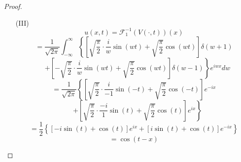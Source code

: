 \documentclass[linespread=1.5,openany]{book}%
\theoremstyle{plain}
\begin{document}
{{{\begin{proof}
\begin{itemize}
							最后得
							\begin{equation}
								\begin{aligned}
									V(w, t) &= \sqrt{\frac{\pi}{2}} \cdot \frac{i}{w} \left[ \delta(w + 1) - \delta(w - 1) \right] \sin(wt) \\[8pt]
									&\quad + \sqrt{\frac{\pi}{2}} \left[ \delta(w + 1) + \delta(w - 1) \right] \cos(wt) \\[8pt]
									&= \left( \sqrt{\frac{\pi}{2}} \cdot \frac{i}{w} \sin(wt) + \sqrt{\frac{\pi}{2}} \cos(wt) \right) \delta(w + 1) \\[8pt]
									&\quad + \left( -\sqrt{\frac{\pi}{2}} \cdot \frac{i}{w} \sin(wt) + \sqrt{\frac{\pi}{2}} \cos(wt) \right) \delta(w - 1)
								\end{aligned}
							\end{equation}
							做逆变换,频率到时间
							\item[(III)]
							\[	
							u(x, t) = \mathcal{F}_1^{-1}(V(\cdot, t))(x) \]
							\[	= \frac{1}{\sqrt{2\pi}} \int_{-\infty}^{\infty} \left\{ \left[ \sqrt{\frac{\pi}{2}} \cdot \frac{i}{w} \sin(wt) + \sqrt{\frac{\pi}{2}} \cos(wt) \right] \delta(w + 1) \right. \]
							\[\quad \left. + \left[ -\sqrt{\frac{\pi}{2}} \cdot \frac{i}{w} \sin(wt) + \sqrt{\frac{\pi}{2}} \cos(wt) \right] \delta(w - 1) \right\} e^{iwx} dw \]
							\[= \frac{1}{\sqrt{2\pi}} \left\{ \left[ \sqrt{\frac{\pi}{2}} \cdot \frac{i}{-1} \sin(-t) + \sqrt{\frac{\pi}{2}} \cos(-t) \right] e^{-ix} \right. \]
							\[\quad \left. + \left[ \sqrt{\frac{\pi}{2}} \cdot \frac{-i}{1} \sin(t) + \sqrt{\frac{\pi}{2}} \cos(t) \right] e^{ix} \right\} \]
							\[= \frac{1}{2} \left\{ \left[ -i \sin(t) + \cos(t) \right] e^{ ix} + \left[ i \sin(t) + \cos(t) \right] e^{-ix} \right\} \]
							\[= \cos(t - x)\]
							
						\end{itemize}
					\end{proof}
					
}}}
\end{document}
